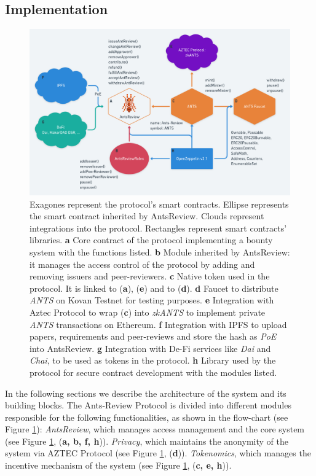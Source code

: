 \documentclass[runningheads]{llncs}
\begin{document}
\subsection{Implementation}

\begin{figure}
\centering
\includegraphics[scale=0.28]{AntsReview}
\small{
\caption{Exagones represent the protocol's smart contracts. Ellipse represents the smart contract inherited by AntsReview. Clouds represent integrations into the protocol. Rectangles represent smart contracts' libraries.
\textbf{a} Core contract of the protocol implementing a bounty system with the functions listed.
\textbf{b} Module inherited by AntsReview: it manages the access control of the protocol by adding and removing issuers and peer-reviewers.
\textbf{c} Native token used in the protocol. It is linked to (\textbf{a}), (\textbf{e}) and to (\textbf{d}).
\textbf{d} Faucet to distribute \emph{ANTS} on Kovan Testnet for testing purposes. 
\textbf{e} Integration with Aztec Protocol to wrap (\textbf{c}) into \emph{zkANTS} to implement private \emph{ANTS} transactions on Ethereum.
\textbf{f} Integration with IPFS to upload papers, requirements and peer-reviews and store the hash as \emph{PoE} into AntsReview.
\textbf{g} Integration with De-Fi services like \emph{Dai} and \emph{Chai}, to be used as tokens in the protocol.
\textbf{h} Library used by the protocol for secure contract development with the modules listed.}}
\label{fig:contracts}
\end{figure}

In the following sections we describe the architecture of the system and its building blocks.
\newline The Ants-Review Protocol is divided into different modules responsible for the following functionalities, as shown in the flow-chart (see Figure \ref{fig:contracts}):
\emph{AntsReview}, which manages access management and the core system (see Figure \ref{fig:contracts}, (\textbf{a, b, f, h})).
\emph{Privacy}, which maintains the anonymity of the system via AZTEC Protocol (see Figure  \ref{fig:contracts}, (\textbf{d})).
\emph{Tokenomics}, which manages the incentive mechanism of the system (see Figure \ref{fig:contracts}, (\textbf{c, e, h})).
\end{document}
